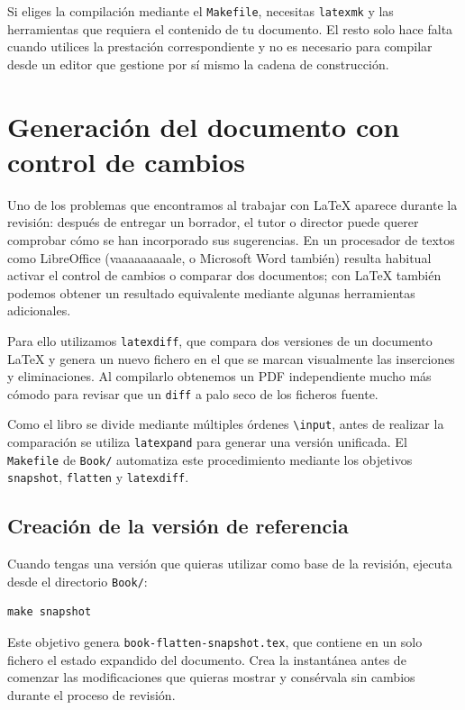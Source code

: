 Si eliges la compilación mediante el \texttt{Makefile}, necesitas \texttt{latexmk} y las herramientas que requiera el contenido de tu documento. El resto solo hace falta cuando utilices la prestación correspondiente y no es necesario para compilar desde un editor que gestione por sí mismo la cadena de construcción.


\section{Generación del documento con control de cambios}
\label{sec:control-de-cambios}

Uno de los problemas que encontramos al trabajar con \LaTeX{} aparece durante la revisión: después de entregar un borrador, el tutor o director puede querer comprobar cómo se han incorporado sus sugerencias. En un procesador de textos como LibreOffice (vaaaaaaaaale, o Microsoft Word también) resulta habitual activar el control de cambios o comparar dos documentos; con \LaTeX{} también podemos obtener un resultado equivalente mediante algunas herramientas adicionales.

Para ello utilizamos \texttt{latexdiff}, que compara dos versiones de un documento \LaTeX{} y genera un nuevo fichero en el que se marcan visualmente las inserciones y eliminaciones. Al compilarlo obtenemos un PDF independiente mucho más cómodo para revisar que un \texttt{diff} a palo seco de los ficheros fuente.

Como el libro se divide mediante múltiples órdenes \texttt{\textbackslash{}input}, antes de realizar la comparación se utiliza \texttt{latexpand} para generar una versión unificada. El \texttt{Makefile} de \texttt{Book/} automatiza este procedimiento mediante los objetivos \texttt{snapshot}, \texttt{flatten} y \texttt{latexdiff}.

\subsection{Creación de la versión de referencia}

Cuando tengas una versión que quieras utilizar como base de la revisión, ejecuta desde el directorio \texttt{Book/}:

\begin{verbatim}
make snapshot
\end{verbatim}

Este objetivo genera \texttt{book-flatten-snapshot.tex}, que contiene en un solo fichero el estado expandido del documento. Crea la instantánea antes de comenzar las modificaciones que quieras mostrar y consérvala sin cambios durante el proceso de revisión.

